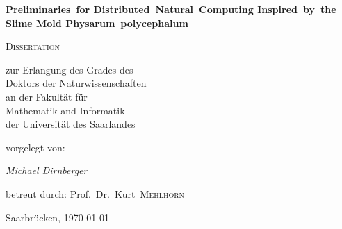 
\begin{titlepage}
	\centering
	\vfill

	{\huge\bfseries Preliminaries~for Distributed~Natural~Computing Inspired~by~the Slime Mold Physarum~polycephalum\par}
	\vspace{2cm}

	{\scshape\Large Dissertation\par}
	\vspace{1.5cm}

	{\large zur Erlangung des Grades des \\
	Doktors der Naturwissenschaften \\
	an der Fakult\"at f\"ur \\
	Mathematik and Informatik \\
	der Universit\"at des Saarlandes}
	
	\vfill
	{vorgelegt von:}
	\vfill

	{\Large\itshape Michael Dirnberger\par}
	\vfill
	{betreut durch:}
	\vfill
	Prof.~Dr.~Kurt~\textsc{Mehlhorn}

	\vfill

	{\large Saarbr\"ucken, \today\par}
\end{titlepage}